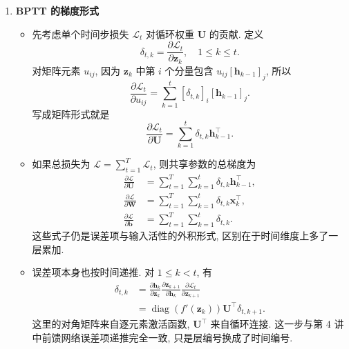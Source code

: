 \documentclass{../nndlcourse}
\begin{document}
\begin{enumerate}
\item \textbf{BPTT 的梯度形式}
  \begin{itemize}
    \item 先考虑单个时间步损失 $\mathcal{L}_t$ 对循环权重 $\boldsymbol{U}$ 的贡献. 定义
    \begin{equation*}
      \delta_{t,k} = \frac{\partial \mathcal{L}_t}{\partial \boldsymbol{z}_k},
      \quad 1 \le k \le t.
    \end{equation*}
    对矩阵元素 $u_{ij}$, 因为 $\boldsymbol{z}_k$ 中第 $i$ 个分量包含 $u_{ij}{[\boldsymbol{h}_{k-1}]}_j$, 所以
    \begin{equation*}
      \frac{\partial \mathcal{L}_t}{\partial u_{ij}}
      = \sum_{k=1}^{t} {[\delta_{t,k}]}_i{[\boldsymbol{h}_{k-1}]}_j.
    \end{equation*}
    写成矩阵形式就是
    \begin{equation*}
      \frac{\partial \mathcal{L}_t}{\partial \boldsymbol{U}}
      = \sum_{k=1}^{t}\delta_{t,k}\boldsymbol{h}_{k-1}^{\top}.
    \end{equation*}
    \item 如果总损失为 $\mathcal{L}=\sum_{t=1}^{T}\mathcal{L}_t$, 则共享参数的总梯度为
    \begin{align*}
      \frac{\partial \mathcal{L}}{\partial \boldsymbol{U}}
      &= \sum_{t=1}^{T}\sum_{k=1}^{t}\delta_{t,k}\boldsymbol{h}_{k-1}^{\top}, \\
      \frac{\partial \mathcal{L}}{\partial \boldsymbol{W}}
      &= \sum_{t=1}^{T}\sum_{k=1}^{t}\delta_{t,k}\boldsymbol{x}_{k}^{\top}, \\
      \frac{\partial \mathcal{L}}{\partial \boldsymbol{b}}
      &= \sum_{t=1}^{T}\sum_{k=1}^{t}\delta_{t,k}.
    \end{align*}
    这些式子仍是误差项与输入活性的外积形式, 区别在于时间维度上多了一层累加.
    \item 误差项本身也按时间递推. 对 $1 \le k < t$, 有
    \begin{align*}
      \delta_{t,k}
      &= \frac{\partial \boldsymbol{h}_k}{\partial \boldsymbol{z}_k}
         \frac{\partial \boldsymbol{z}_{k+1}}{\partial \boldsymbol{h}_k}
         \frac{\partial \mathcal{L}_t}{\partial \boldsymbol{z}_{k+1}} \\
      &= \operatorname{diag}\left(f'(\boldsymbol{z}_k)\right)
         \boldsymbol{U}^{\top}\delta_{t,k+1}.
    \end{align*}
    这里的对角矩阵来自逐元素激活函数, $\boldsymbol{U}^{\top}$ 来自循环连接. 这一步与第 4 讲中前馈网络误差项递推完全一致, 只是层编号换成了时间编号.
  \end{itemize}


\end{enumerate}
\end{document}
